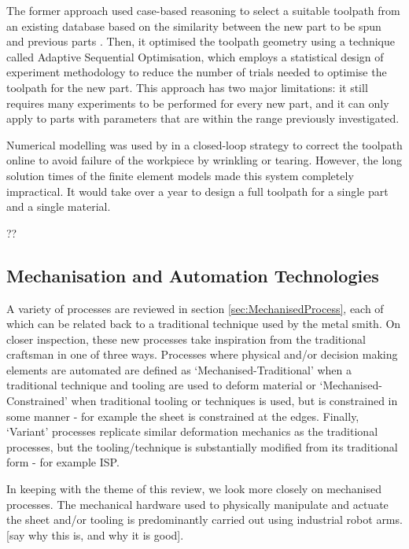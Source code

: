 The former approach used case-based reasoning to select a suitable toolpath from an existing database based on the similarity between the new part to be spun and previous parts \citep{Henkenjohann2005AnProcess}. Then, it optimised the toolpath geometry using a technique called Adaptive Sequential Optimisation, which employs a statistical design of experiment methodology to reduce the number of trials needed to optimise the toolpath for the new part. This approach has two major limitations: it still requires many experiments to be performed for every new part, and it can only apply to parts with parameters that are within the range previously investigated. 

Numerical modelling was used by \citep{Polyblank2015ParametricSpinning} in a closed-loop strategy to correct the toolpath online to avoid failure of the workpiece by wrinkling or tearing. However, the long solution times of the finite element models made this system completely impractical. It would take over a year to design a full toolpath for a single part and a single material. 


 \citep{Wang2011ASpinning}??
 
 
\subsection{Mechanisation and Automation Technologies \label{sec:MechandAuto}}

A variety of processes are reviewed in section \ref{sec:MechanisedProcess}, each of which can be related back to a traditional technique used by the metal smith. On closer inspection, these new processes take inspiration from the traditional craftsman in one of three ways. Processes where physical and/or decision making elements are automated are defined as `Mechanised-Traditional' when a traditional technique and tooling are used to deform material or `Mechanised-Constrained' when traditional tooling or techniques is used, but is constrained in some manner - for example the sheet is constrained at the edges. Finally, `Variant' processes replicate similar deformation mechanics as the traditional processes, but the tooling/technique is substantially modified from its traditional form - for example ISP. 

In keeping with the theme of this review, we look more closely on mechanised processes. The mechanical hardware used to physically manipulate and actuate the sheet and/or tooling is predominantly carried out using industrial robot arms. [say why this is, and why it is good]. 

